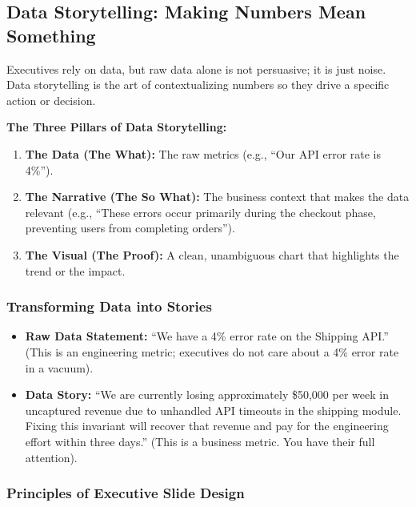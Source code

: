 \documentclass[
  11pt,
  openany,
  oneside]{book}
\providecommand{\tightlist}{%
  \setlength{\itemsep}{0pt}\setlength{\parskip}{0pt}}
\begin{document}
\subsection{Data Storytelling: Making Numbers Mean
Something}\label{data-storytelling-making-numbers-mean-something}

Executives rely on data, but raw data alone is not persuasive; it is
just noise. Data storytelling is the art of contextualizing numbers so
they drive a specific action or decision.

\textbf{The Three Pillars of Data Storytelling:}

\begin{enumerate}
\def\labelenumi{\arabic{enumi}.}
\tightlist
\item
  \textbf{The Data (The What):} The raw metrics (e.g., ``Our API error
  rate is 4\%'').
\item
  \textbf{The Narrative (The So What):} The business context that makes
  the data relevant (e.g., ``These errors occur primarily during the
  checkout phase, preventing users from completing orders'').
\item
  \textbf{The Visual (The Proof):} A clean, unambiguous chart that
  highlights the trend or the impact.
\end{enumerate}

\subsubsection{Transforming Data into
Stories}\label{transforming-data-into-stories}

\begin{itemize}
\tightlist
\item
  \textbf{Raw Data Statement:} ``We have a 4\% error rate on the
  Shipping API.'' (This is an engineering metric; executives do not care
  about a 4\% error rate in a vacuum).
\item
  \textbf{Data Story:} ``We are currently losing approximately \$50,000
  per week in uncaptured revenue due to unhandled API timeouts in the
  shipping module. Fixing this invariant will recover that revenue and
  pay for the engineering effort within three days.'' (This is a
  business metric. You have their full attention).
\end{itemize}

\subsubsection{Principles of Executive Slide
Design}\label{principles-of-executive-slide-design}
\end{document}
